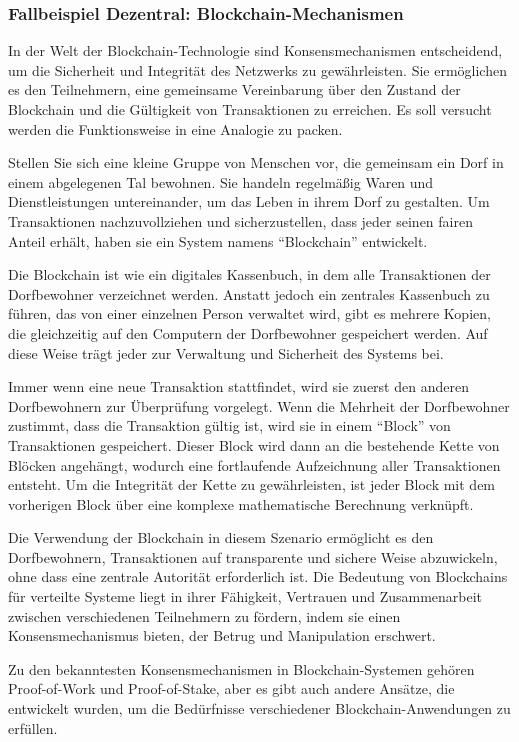 \subsubsection{Fallbeispiel Dezentral: Blockchain-Mechanismen}

In der Welt der Blockchain-Technologie sind Konsensmechanismen entscheidend, um die Sicherheit und Integrität des Netzwerks zu gewährleisten. Sie ermöglichen es den Teilnehmern, eine gemeinsame Vereinbarung über den Zustand der Blockchain und die Gültigkeit von Transaktionen zu erreichen. Es soll versucht werden die Funktionsweise in eine Analogie zu packen. 

Stellen Sie sich eine kleine Gruppe von Menschen vor, die gemeinsam ein Dorf in einem abgelegenen Tal bewohnen. Sie handeln regelmäßig Waren und Dienstleistungen untereinander, um das Leben in ihrem Dorf zu gestalten. Um Transaktionen nachzuvollziehen und sicherzustellen, dass jeder seinen fairen Anteil erhält, haben sie ein System namens \enquote{Blockchain} entwickelt.

Die Blockchain ist wie ein digitales Kassenbuch, in dem alle Transaktionen der Dorfbewohner verzeichnet werden. Anstatt jedoch ein zentrales Kassenbuch zu führen, das von einer einzelnen Person verwaltet wird, gibt es mehrere Kopien, die gleichzeitig auf den Computern der Dorfbewohner gespeichert werden. Auf diese Weise trägt jeder zur Verwaltung und Sicherheit des Systems bei.

Immer wenn eine neue Transaktion stattfindet, wird sie zuerst den anderen Dorfbewohnern zur Überprüfung vorgelegt. Wenn die Mehrheit der Dorfbewohner zustimmt, dass die Transaktion gültig ist, wird sie in einem \enquote{Block} von Transaktionen gespeichert. Dieser Block wird dann an die bestehende Kette von Blöcken angehängt, wodurch eine fortlaufende Aufzeichnung aller Transaktionen entsteht. Um die Integrität der Kette zu gewährleisten, ist jeder Block mit dem vorherigen Block über eine komplexe mathematische Berechnung verknüpft.

Die Verwendung der Blockchain in diesem Szenario ermöglicht es den Dorfbewohnern, Transaktionen auf transparente und sichere Weise abzuwickeln, ohne dass eine zentrale Autorität erforderlich ist. Die Bedeutung von Blockchains für verteilte Systeme liegt in ihrer Fähigkeit, Vertrauen und Zusammenarbeit zwischen verschiedenen Teilnehmern zu fördern, indem sie einen Konsensmechanismus bieten, der Betrug und Manipulation erschwert.

Zu den bekanntesten Konsensmechanismen in Blockchain-Systemen gehören Proof-of-Work und Proof-of-Stake, aber es gibt auch andere Ansätze, die entwickelt wurden, um die Bedürfnisse verschiedener Blockchain-Anwendungen zu erfüllen.

